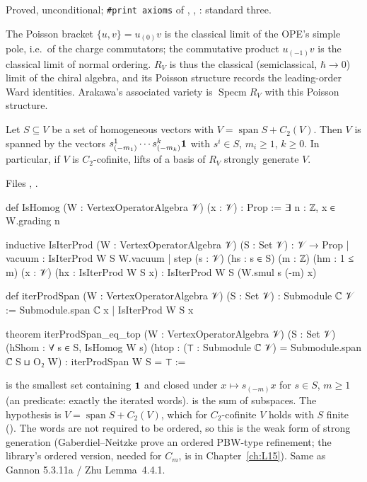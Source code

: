 \begin{status}
Proved, unconditional; \texttt{\#print axioms} of , ,
: standard three.
\end{status}

\begin{physics}
The Poisson bracket $\{u,v\} = u_{(0)}v$ is the classical limit of the OPE's simple pole, i.e.\ of the charge
commutators; the commutative product $u_{(-1)}v$ is the classical limit of normal ordering. $R_V$ is thus the
classical (semiclassical, $\hbar\to0$) limit of the chiral algebra, and its Poisson structure records the
leading-order Ward identities. Arakawa's associated variety is $\operatorname{Specm}R_V$ with this Poisson
structure.
\end{physics}

\begin{theorem}\label{l12:thm:fingen}
Let $S\subseteq V$ be a set of homogeneous vectors with $V = \operatorname{span}S + C_2(V)$. Then $V$ is spanned by
the vectors $s^1_{(-m_1)}\cdots s^k_{(-m_k)}\mathbf{1}$ with $s^i\in S$, $m_i\ge1$, $k\ge0$. In particular, if $V$ is
$C_2$-cofinite, lifts of a basis of $R_V$ strongly generate $V$.
\end{theorem}
\noindent Files ,
.
\begin{leancode}
def IsHomog (W : VertexOperatorAlgebra 𝒱) (x : 𝒱) : Prop := ∃ n : ℤ, x ∈ W.grading n

inductive IsIterProd (W : VertexOperatorAlgebra 𝒱) (S : Set 𝒱) : 𝒱 → Prop
  | vacuum : IsIterProd W S W.vacuum
  | step (s : 𝒱) (hs : s ∈ S) (m : ℤ) (hm : 1 ≤ m) (x : 𝒱) (hx : IsIterProd W S x) :
      IsIterProd W S (W.smul s (-m) x)

def iterProdSpan (W : VertexOperatorAlgebra 𝒱) (S : Set 𝒱) : Submodule ℂ 𝒱 :=
  Submodule.span ℂ {x | IsIterProd W S x}

theorem iterProdSpan_eq_top (W : VertexOperatorAlgebra 𝒱) (S : Set 𝒱)
    (hShom : ∀ s ∈ S, IsHomog W s)
    (htop : (⊤ : Submodule ℂ 𝒱) = Submodule.span ℂ S ⊔ O₂ W) :
    iterProdSpan W S = ⊤ :=
\end{leancode}

\begin{dictionary}
 is the smallest set containing $\mathbf{1}$ and closed under $x\mapsto s_{(-m)}x$ for $s\in S$,
$m\ge1$ (an  predicate: exactly the iterated words).  is the sum of subspaces. The
hypothesis  is $V = \operatorname{span}S + C_2(V)$, which for $C_2$-cofinite $V$ holds with $S$ finite
(\allowbreak{}\allowbreak{}\allowbreak{}\allowbreak{}). The words are not required to be ordered, so this is the weak form of
strong generation (Gaberdiel--Neitzke prove an ordered PBW-type refinement; the library's ordered version,
needed for $C_m$, is in Chapter~\ref{ch:L15}). Same as Gannon 5.3.11a / Zhu Lemma~4.4.1.
\end{dictionary}

